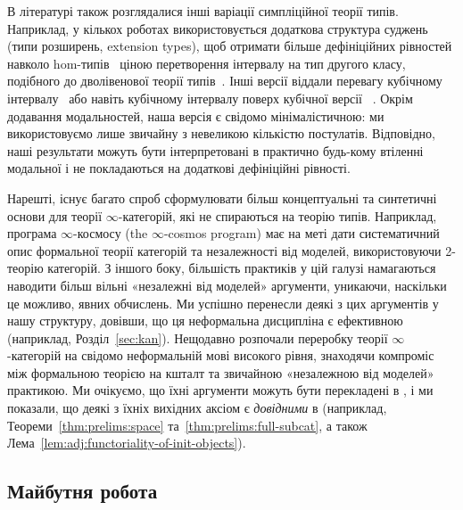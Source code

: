 \documentclass[12pt]{article}
\newcommand{\textcite}{\cite}
\newcommand{\parencite}{\cite}
\begin{document}
В літературі також розглядалися інші варіації симпліційної теорії типів. Наприклад, у кількох роботах використовується додаткова структура суджень (типи розширень, extension types), щоб отримати більше дефініційних рівностей навколо hom-типів~\parencite{riehl:2017,bardomiano:2021,weinberger:phd,buchholtz:2023,weinberger:twosided:2024,weinberger:sums:2024} ціною перетворення інтервалу на тип другого класу, подібного до дволівенової теорії типів~\parencite{annenkov:2023,voevodsky:2013}. Інші версії віддали перевагу кубічному інтервалу~\parencite{gratzer:2024} або навіть кубічному інтервалу поверх кубічної версії \HoTT{}~\parencite{weaver:2020,weaver:phd}. Окрім додавання модальностей, наша версія \STT{} є свідомо мінімалістичною: ми використовуємо лише звичайну \HoTT{} з невеликою кількістю постулатів. Відповідно, наші результати можуть бути інтерпретовані в практично будь-кому втіленні модальної \STT{} і не покладаються на додаткові дефініційні рівності.

Нарешті, існує багато спроб сформулювати більш концептуальні та синтетичні основи для теорії $\infty$-категорій, які не спираються на теорію типів. Наприклад, програма $\infty$-космосу (the $\infty$-cosmos program) \textcite{riehl:2022} має на меті дати систематичний опис формальної теорії категорій та незалежності від моделей, використовуючи 2-теорію категорій. З іншого боку, більшість практиків у цій галузі намагаються наводити більш вільні «незалежні від моделей» аргументи, уникаючи, наскільки це можливо, явних обчислень. Ми успішно перенесли деякі з цих аргументів у нашу структуру, довівши, що ця неформальна дисципліна є ефективною (наприклад, Розділ~\ref{sec:kan}). Нещодавно \textcite{cisinski:2024} розпочали переробку теорії $\infty$-категорій на свідомо неформальній мові високого рівня, знаходячи компроміс між формальною теорією на кшталт \STT{} та звичайною «незалежною від моделей» практикою. Ми очікуємо, що їхні аргументи можуть бути перекладені в \STT{}, і ми показали, що деякі з їхніх вихідних аксіом є \emph{довідними} в \STT{} (наприклад, Теореми~\ref{thm:prelims:space} та~\ref{thm:prelims:full-subcat}, а також Лема~\ref{lem:adj:functoriality-of-init-objects}).

\subsection{Майбутня робота}
\end{document}
